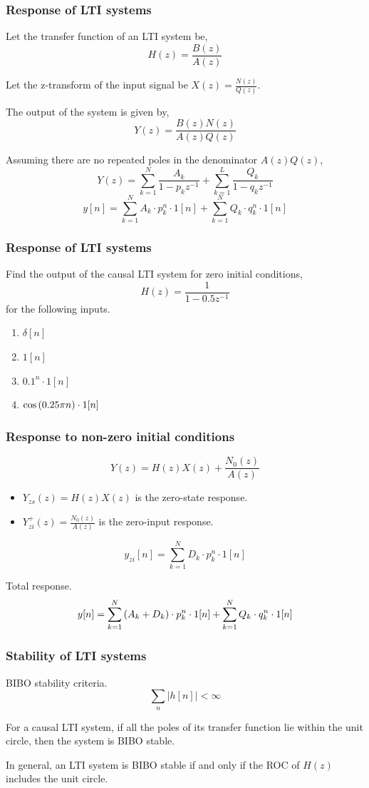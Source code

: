 \documentclass[aspectratio=169]{beamer}
\let\olditem\item
\renewcommand{\item}{\setlength{\itemsep}{\fill}\olditem}
\def\lp{\ensuremath\left(}
\def\rp{\ensuremath\right)}
\begin{document}
\begin{frame}[t]
  \frametitle{Response of LTI systems}
  Let the transfer function of an LTI system be,
  \[ H(z) = \frac{B(z)}{A(z)} \]

  Let the z-transform of the input signal be $X(z) = \frac{N(z)}{Q(z)}$. 

  The output of the system is given by,
  \[ Y(z) = \frac{B(z)N(z)}{A(z)Q(z)} \]

  Assuming there are no repeated poles in the denominator $A(z) Q(z)$,
  \[ Y(z) = \sum_{k=1}^N \frac{A_k}{1 - p_kz^{-1}} + \sum_{k=1}^L \frac{Q_k}{1 - q_kz^{-1}} \]
  \[ y[n] = \sum_{k=1}^N A_k \cdot p_k^n \cdot 1[n] + \sum_{k=1}^N Q_k \cdot q_k^n \cdot 1[n] \]
\end{frame}


\begin{frame}[t]
  \frametitle{Response of LTI systems}
  Find the output of the causal LTI system for zero initial conditions,
  \[ H(z) = \frac{1}{1 - 0.5z^{-1}} \]
  for the following inputs.
  \begin{enumerate}
    \item $\delta[n]$
    \item $1[n]$
    \item $0.1^n \cdot 1[n]$
    \item $\cos \lp 0.25\pi n\rp \cdot 1[n]$
  \end{enumerate}
\end{frame}

\begin{frame}[t]
  \frametitle{Response to non-zero initial conditions}
  \[ Y(z) = H(z) X(z) + \frac{N_0(z)}{A(z)} \]

  \begin{itemize}
    \item $Y_{zs}(z) = H(z) X(z)$ is the zero-state response.
    \item $Y_{zi}^+(z) = \frac{N_0(z)}{A(z)}$ is the zero-input response.
  \end{itemize}

  \[ y_{zi}[n] = \sum_{k=1}^N D_k \cdot p_k^n \cdot 1[n] \]

  Total response.
  \[ y[n] = \sum_{k=1}^N \lp A_k + D_k \rp \cdot p_k^n \cdot 1[n] + \sum_{k=1}^N Q_k \cdot q_k^n \cdot 1[n] \]
\end{frame}

\begin{frame}[t]
  \frametitle{Stability of LTI systems}
  BIBO stability criteria.
  \[ \sum_n \vert h[n] \vert < \infty \]

  For a causal LTI system, if all the poles of its transfer function lie within the unit circle, then the system is BIBO stable.

  In general, an LTI system is BIBO stable if and only if the ROC of $H(z)$ includes the unit circle.
\end{frame}
\end{document}

